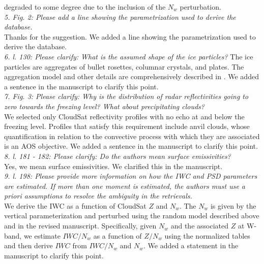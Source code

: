 \documentclass[12pt]{article}
\begin{document}
degraded to some degree due to the inclusion of the $N_w$ perturbation.\\
\newline
\textit{5. Fig. 2: Please add a line showing the parametrization used to derive the database.}\\
\newline
Thanks for the suggestion.  We added a line showing the parametrization used to derive the database.\\
\newline
\textit{6. l. 130: Please clarify: What is the assumed shape of the ice particles?}
The ice particles are aggregates of bullet rosettes, columnar crystals, and plates.  The aggregation model and 
other details are comprehensively described in \cite{hogan2014}. We added a sentence in the manuscript to clarify this point.\\
\newline
\textit{7. Fig. 3: Please clarify: Why is the distribution of radar reflectivities going to zero towards the freezing level? 
    What about precipitating clouds?}\\
\newline
We selected only CloudSat reflectivity profiles with no echo at and below the freezing level.  
Profiles that satisfy this requirement include anvil clouds, whose quantification in relation to the convective process with which they are associated
is an AOS objective. We added a sentence in the manuscript to clarify this point.\\
\newline
\textit{8. l. 181 - 182: Please clarify: Do the authors mean surface emissivities?}\\
\newline
Yes, we mean surface emissivities.  We clarified this in the manuscript.\\
\newline
\textit{9. l. 198: Please provide more information on how the IWC and PSD parameters are estimated. If more than one moment
is estimated, the authors must use a priori assumptions to resolve the ambiguity in the retrievals.}\\
\newline
We derive the IWC as a function of CloudSat $Z$ and $N_w$.  The $N_w$ is given by the vertical parameterization and perturbed using the random model
described above and in the revised manuscript.  Specifically, given $N_w$ and the associated $Z$ at W-band, we estimate $IWC/N_w$ as a function of $Z/N_w$ using the
normalized tables and then derive $IWC$ from $IWC/N_w$ and $N_w$. We added a statement in the manuscript to clarify this point.\\
\end{document}
